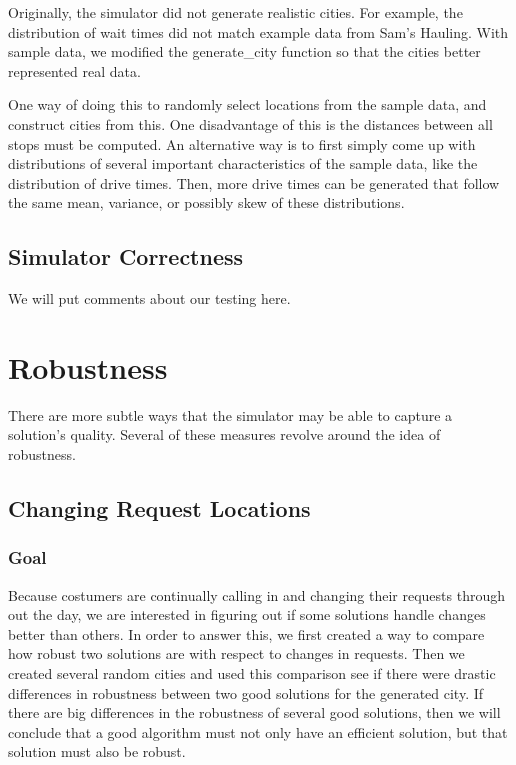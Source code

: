 \documentclass{article}
\begin{document}
Originally, the simulator did not generate realistic cities.
For example, the distribution of wait times did not match example data from Sam's Hauling.
With sample data, we modified the generate\_city function so that the cities better represented real data.

One way of doing this to randomly select locations from the sample data, and construct cities from this.
One disadvantage of this is the distances between all stops must be computed.
An alternative way is to first simply come up with distributions of several important characteristics of the sample data, like the distribution of drive times.
Then, more drive times can be generated that follow the same mean, variance, or possibly skew of these distributions.





\subsection{Simulator Correctness}


We will put comments about our testing here.



\section{Robustness}

There are more subtle ways that the simulator may be able to capture a solution's quality.
Several of these measures revolve around the idea of robustness.


\subsection{Changing Request Locations}


\subsubsection{Goal}

Because costumers are continually calling in and changing their requests through out the day, we are interested in figuring out if some solutions handle changes better than others.
In order to answer this, we first created a way to compare how robust two solutions are with respect to changes in requests.
Then we created several random cities and used this comparison see if there were drastic differences in robustness between two good solutions for the generated city.
If there are big differences in the robustness of several good solutions, then we will conclude that a good algorithm must not only have an efficient solution, but that solution must also be robust.
\end{document}
